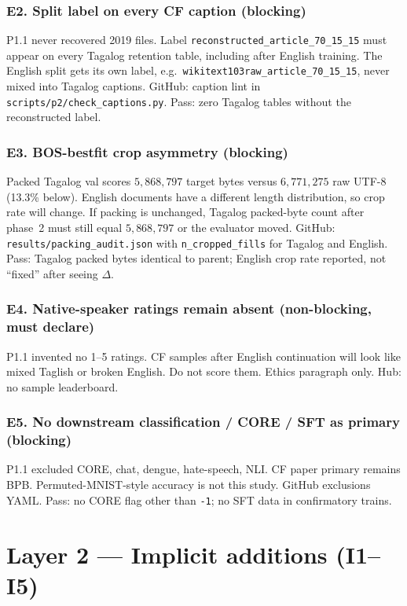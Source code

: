 \documentclass[11pt,a4paper]{article}
\begin{document}
\subsubsection*{E2. Split label on every CF caption (blocking)}
P1.1 never recovered 2019 files. Label \texttt{reconstructed\_article\_70\_15\_15} must appear on every Tagalog retention table, including after English training. The English split gets its own label, e.g.\ \texttt{wikitext103raw\_article\_70\_15\_15}, never mixed into Tagalog captions. GitHub: caption lint in \texttt{scripts/p2/check\_captions.py}. Pass: zero Tagalog tables without the reconstructed label.

\subsubsection*{E3. BOS-bestfit crop asymmetry (blocking)}
Packed Tagalog val scores $5{,}868{,}797$ target bytes versus $6{,}771{,}275$ raw UTF-8 (13.3\% below). English documents have a different length distribution, so crop rate will change. If packing is unchanged, Tagalog packed-byte count after phase~2 must still equal $5{,}868{,}797$ or the evaluator moved. GitHub: \texttt{results/packing\_audit.json} with \texttt{n\_cropped\_fills} for Tagalog and English. Pass: Tagalog packed bytes identical to parent; English crop rate reported, not ``fixed'' after seeing $\Delta$.

\subsubsection*{E4. Native-speaker ratings remain absent (non-blocking, must declare)}
P1.1 invented no 1--5 ratings. CF samples after English continuation will look like mixed Taglish or broken English. Do not score them. Ethics paragraph only. Hub: no sample leaderboard.

\subsubsection*{E5. No downstream classification / CORE / SFT as primary (blocking)}
P1.1 excluded CORE, chat, dengue, hate-speech, NLI. CF paper primary remains BPB. Permuted-MNIST-style accuracy is not this study. GitHub exclusions YAML. Pass: no CORE flag other than \texttt{-1}; no SFT data in confirmatory trains.

\section{Layer 2 --- Implicit additions (I1--I5)}
\label{sec:L2}
\end{document}

